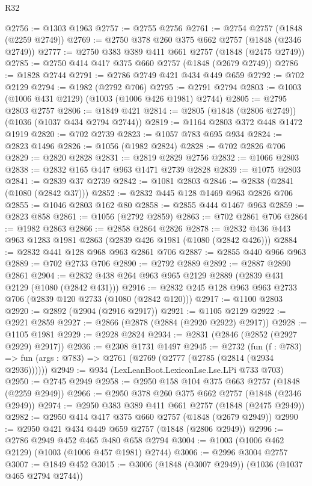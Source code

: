 \begin{lexlean}{R32}
\begin{coremodule}
@2756 := @1303 @1963
@2757 := @2755 @2756
@2761 := @2754 @2757 (@1848 (@2259 @2749))
@2769 := @2750 @378 @260 @375 @662 @2757 (@1848 (@2346 @2749))
@2777 := @2750 @383 @389 @411 @661 @2757 (@1848 (@2475 @2749))
@2785 := @2750 @414 @417 @375 @660 @2757 (@1848 (@2679 @2749))
@2786 := @1828 @2744
@2791 := @2786 @2749 @421 @434 @449 @659
@2792 := @702 @2129
@2794 := @1982 (@2792 @706)
@2795 := @2791 @2794
@2803 := @1003 (@1006 @431 @2129) (@1003 (@1006 @426 @1981) @2744)
@2805 := @2795 @2803 @2757
@2806 := @1849 @421
@2814 := @2805 (@1848 (@2806 @2749)) (@1036 (@1037 @434 @2794 @2744))
@2819 := @1164 @2803 @372 @448 @1472 @1919
@2820 := @702 @2739
@2823 := @1057 @783 @695 @934
@2824 := @2823 @1496
@2826 := @1056 (@1982 @2824)
@2828 := @702 @2826 @706
@2829 := @2820 @2828
@2831 := @2819 @2829 @2756
@2832 := @1066 @2803
@2838 := @2832 @165 @447 @963 @1471 @2739 @2828
@2839 := @1075 @2803
@2841 := @2839 @37 @2739
@2842 := @1081 @2803
@2846 := @2838 (@2841 (@1080 (@2842 @37)))
@2852 := @2832 @445 @128 @1469 @963 @2826 @706
@2855 := @1046 @2803 @162 @80
@2858 := @2855 @444 @1467 @963
@2859 := @2823 @858
@2861 := @1056 (@2792 @2859)
@2863 := @702 @2861 @706
@2864 := @1982 @2863
@2866 := @2858 @2864 @2826
@2878 := @2832 @436 @443 @963 @1283 @1981 @2863 (@2839 @426 @1981 (@1080 (@2842 @426)))
@2884 := @2832 @441 @128 @968 @963 @2861 @706
@2887 := @2855 @440 @966 @963
@2889 := @702 @2733 @706
@2890 := @2792 @2889
@2892 := @2887 @2890 @2861
@2904 := @2832 @438 @264 @963 @965 @2129 @2889 (@2839 @431 @2129 (@1080 (@2842 @431)))
@2916 := @2832 @245 @128 @963 @963 @2733 @706 (@2839 @120 @2733 (@1080 (@2842 @120)))
@2917 := @1100 @2803
@2920 := @2892 (@2904 (@2916 @2917))
@2921 := @1105 @2129
@2922 := @2921 @2859
@2927 := @2866 (@2878 (@2884 (@2920 @2922) @2917))
@2928 := @1105 @1981
@2929 := @2928 @2824
@2934 := @2831 (@2846 (@2852 (@2927 @2929) @2917))
@2936 := @2308 @1731 @1497
@2945 := @2732
    (fun (f : @783) => fun (args : @783) => @2761 (@2769 (@2777 (@2785 (@2814 (@2934 @2936))))))
@2949 := @934 (LexLeanBoot.LexiconLse.Lse.LPi @733 @703)
@2950 := @2745 @2949
@2958 := @2950 @158 @104 @375 @663 @2757 (@1848 (@2259 @2949))
@2966 := @2950 @378 @260 @375 @662 @2757 (@1848 (@2346 @2949))
@2974 := @2950 @383 @389 @411 @661 @2757 (@1848 (@2475 @2949))
@2982 := @2950 @414 @417 @375 @660 @2757 (@1848 (@2679 @2949))
@2990 := @2950 @421 @434 @449 @659 @2757 (@1848 (@2806 @2949))
@2996 := @2786 @2949 @452 @465 @480 @658 @2794
@3004 := @1003 (@1006 @462 @2129) (@1003 (@1006 @457 @1981) @2744)
@3006 := @2996 @3004 @2757
@3007 := @1849 @452
@3015 := @3006 (@1848 (@3007 @2949)) (@1036 (@1037 @465 @2794 @2744))

\end{coremodule}
\end{lexlean}

